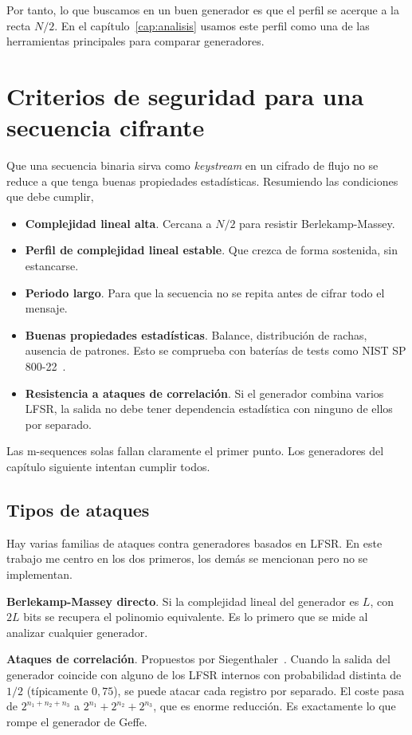 Por tanto, lo que buscamos en un buen generador es que el perfil se acerque a la recta $N/2$.
En el capítulo~\ref{cap:analisis} usamos este perfil como una de las herramientas principales para comparar generadores.

\section{Criterios de seguridad para una secuencia cifrante}

Que una secuencia binaria sirva como \textit{keystream} en un cifrado de flujo no se reduce a que tenga buenas propiedades estadísticas.
Resumiendo las condiciones que debe cumplir,

\begin{itemize}
  \item \textbf{Complejidad lineal alta}. Cercana a $N/2$ para resistir Berlekamp-Massey.
  \item \textbf{Perfil de complejidad lineal estable}. Que crezca de forma sostenida, sin estancarse.
  \item \textbf{Periodo largo}. Para que la secuencia no se repita antes de cifrar todo el mensaje.
  \item \textbf{Buenas propiedades estadísticas}. Balance, distribución de rachas, ausencia de patrones.
        Esto se comprueba con baterías de tests como NIST SP 800-22~\cite{nist2010}.
  \item \textbf{Resistencia a ataques de correlación}.
        Si el generador combina varios LFSR, la salida no debe tener dependencia estadística con ninguno de ellos por separado.
\end{itemize}

Las m-sequences solas fallan claramente el primer punto. Los generadores del capítulo siguiente intentan cumplir todos.

\subsection{Tipos de ataques}

Hay varias familias de ataques contra generadores basados en LFSR.
En este trabajo me centro en los dos primeros, los demás se mencionan pero no se implementan.

\textbf{Berlekamp-Massey directo}. Si la complejidad lineal del generador es $L$,
con $2L$ bits se recupera el polinomio equivalente. Es lo primero que se mide al analizar cualquier generador.

\textbf{Ataques de correlación}. Propuestos por Siegenthaler~\cite{siegenthaler1985}.
Cuando la salida del generador coincide con alguno de los LFSR internos con probabilidad distinta de $1/2$ (típicamente $0{,}75$),
se puede atacar cada registro por separado. El coste pasa de $2^{n_1 + n_2 + n_3}$ a $2^{n_1} + 2^{n_2} + 2^{n_3}$,
que es enorme reducción. Es exactamente lo que rompe el generador de Geffe.

